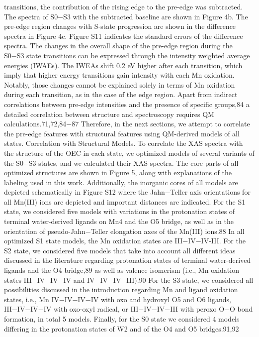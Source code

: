 \documentclass{article}
\begin{document}
transitions, the contribution of the rising edge to the pre-edge
was subtracted. The spectra of S0−S3 with the subtracted
baseline are shown in Figure 4b. The pre-edge region changes
with S-state progression are shown in the difference spectra in
Figure 4c. Figure S11 indicates the standard errors of the
difference spectra.
The changes in the overall shape of the pre-edge region
during the S0−S3 state transitions can be expressed through the
intensity weighted average energies (IWAEs). The IWEAs shift
0.2 eV higher after each transition, which imply that higher
energy transitions gain intensity with each Mn oxidation.
Notably, those changes cannot be explained solely in terms of
Mn oxidation during each transition, as in the case of the edge
region. Apart from indirect correlations between pre-edge
intensities and the presence of specific groups,84 a detailed
correlation between structure and spectroscopy requires QM
calculations.71,72,84−87 Therefore, in the next sections, we
attempt to correlate the pre-edge features with structural
features using QM-derived models of all states.
Correlation with Structural Models. To correlate the
XAS spectra with the structure of the OEC in each state, we
optimized models of several variants of the S0−S3 states, and
we calculated their XAS spectra. The core parts of all
optimized structures are shown in Figure 5, along with
explanations of the labeling used in this work. Additionally, the
inorganic cores of all models are depicted schematically in
Figure S12 where the Jahn−Teller axis orientations for all
Mn(III) ions are depicted and important distances are
indicated. For the S1 state, we considered five models with
variations in the protonation states of terminal water-derived
ligands on Mn4 and the O5 bridge, as well as in the orientation
of pseudo-Jahn−Teller elongation axes of the Mn(III) ions.88
In all optimized S1 state models, the Mn oxidation states are
III−IV−IV-III. For the S2 state, we considered five models that
take into account all different ideas discussed in the literature
regarding protonation states of terminal water-derived ligands
and the O4 bridge,89 as well as valence isomerism (i.e., Mn
oxidation states III−IV−IV−IV and IV−IV−IV−III).90 For
the S3 state, we considered all possibilities discussed in the
introduction regarding Mn and ligand oxidation states, i.e., Mn
IV−IV−IV−IV with oxo and hydroxyl O5 and O6 ligands,
III−IV−IV−IV with oxo-oxyl radical, or III−IV−IV−III with
peroxo O−O bond formation, in total 5 models. Finally, for
the S0 state we considered 4 models differing in the
protonation states of W2 and of the O4 and O5 bridges.91,92
\end{document}
